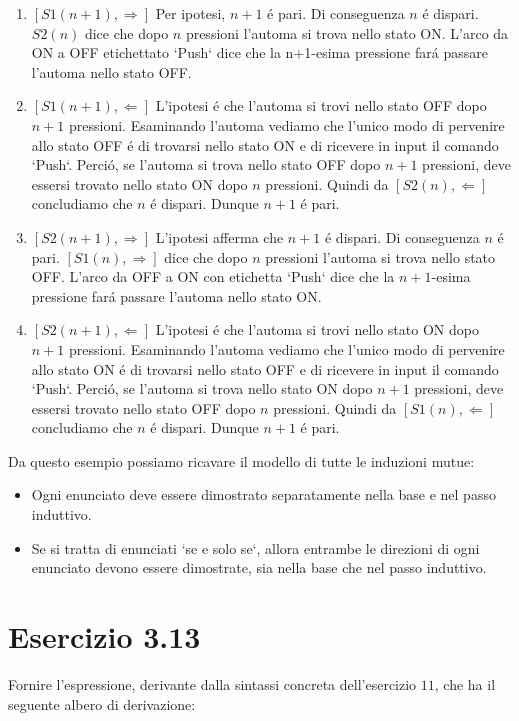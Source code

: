 		\begin{enumerate}
		  \item $[S1(n+1), \Rightarrow]$ Per ipotesi, $n+1$ \'e pari. Di conseguenza $n$ \'e
		  dispari.
		  $S2(n)$ dice che dopo $n$ pressioni l'automa si trova nello stato ON. L'arco
		  da ON a OFF etichettato `Push` dice che la n+1-esima pressione far\'a
		  passare l'automa nello stato OFF.
		  \item $[S1(n+1), \Leftarrow]$ L'ipotesi \'e che l'automa si trovi nello
		  stato OFF dopo $n+1$ pressioni. Esaminando l'automa vediamo che l'unico modo
		  di pervenire allo stato OFF \'e di trovarsi nello stato ON e di ricevere in
		  input il comando `Push`. Perci\'o, se l'automa si trova nello stato OFF dopo
		  $n+1$ pressioni, deve essersi trovato nello stato ON dopo $n$ pressioni.
		  Quindi da $[S2(n), \Leftarrow]$ concludiamo che $n$ \'e dispari. Dunque
		  $n+1$ \'e pari.
		  \item $[S2(n+1), \Rightarrow]$ L'ipotesi afferma che $n+1$ \'e dispari. Di conseguenza
		  $n$ \'e pari. $[S1(n), \Rightarrow]$ dice che dopo $n$ pressioni l'automa si trova
		  nello stato OFF. L'arco da OFF a ON con etichetta `Push` dice che la
		  $n+1$-esima pressione far\'a passare l'automa nello stato ON.
		  \item $[S2(n+1), \Leftarrow]$ L'ipotesi \'e che l'automa si trovi nello
		  stato ON dopo $n+1$ pressioni. Esaminando l'automa vediamo che l'unico modo
		  di pervenire allo stato ON \'e di trovarsi nello stato OFF e di ricevere in
		  input il comando `Push`. Perci\'o, se l'automa si trova nello stato ON dopo
		  $n+1$ pressioni, deve essersi trovato nello stato OFF dopo $n$ pressioni.
		  Quindi da $[S1(n), \Leftarrow]$ concludiamo che $n$ \'e dispari. Dunque
		  $n+1$ \'e pari.
		\end{enumerate}
		
		Da questo esempio possiamo ricavare il modello di tutte le induzioni mutue:
		
		\begin{itemize}
		  \item Ogni enunciato deve essere dimostrato separatamente nella base e nel
		  passo induttivo.
		  \item Se si tratta di enunciati `se e solo se`, allora entrambe le direzioni
		  di ogni enunciato devono essere dimostrate, sia nella base che nel passo
		  induttivo.
		\end{itemize}
		
		\newpage
		
	\section{Esercizio 3.13}
		\qquad Fornire l'espressione, derivante dalla sintassi concreta
		dell'esercizio $11$, che ha il seguente albero di derivazione:
		
